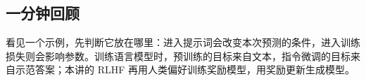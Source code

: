 \subsection*{一分钟回顾}
看见一个示例，先判断它放在哪里：进入提示词会改变本次预测的条件，进入训练损失则会影响参数。训练语言模型时，预训练的目标来自文本，指令微调的目标来自示范答案；本讲的 RLHF 再用人类偏好训练奖励模型，用奖励更新生成模型。
\endgroup
